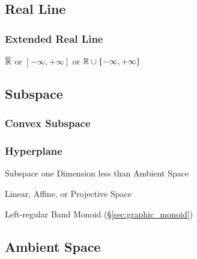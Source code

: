 \subsection{Real Line}\label{sec:real_line}

\subsubsection{Extended Real Line}\label{sec:extended_real_line}

$\overline{\mathbb{R}}$ or $[-\infty, +\infty]$ or $\mathbb{R} \cup \{
-\infty, +\infty\}$



\subsection{Subspace}\label{sec:subspace}




\subsubsection{Convex Subspace}\label{sec:convex_subspace}

\subsubsection{Hyperplane}\label{sec:hyperplane}

Subspace one Dimension less than Ambient Space

Linear, Affine, or Projective Space %

Left-regular Band Monoid (\S\ref{sec:graphic_monoid})



\subsection{Ambient Space}\label{sec:ambient_space}




